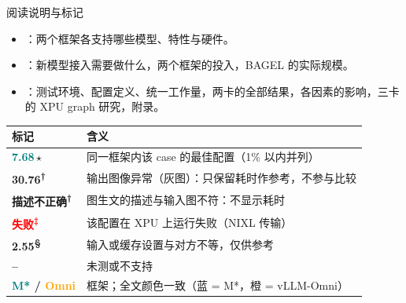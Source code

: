 \begin{frame}[t]{阅读说明与标记}
\small
\begin{itemize}\setlength\itemsep{3pt}
  \item {}：两个框架各支持哪些模型、特性与硬件。
  \item {}：新模型接入需要做什么，两个框架的投入，BAGEL 的实际规模。
  \item {}：测试环境、配置定义、统一工作量，两卡的全部结果，各因素的影响，三卡的 XPU graph 研究，附录。
\end{itemize}
\vspace{2pt}
\scriptsize\renewcommand{\arraystretch}{1.12}
\begin{tabularx}{\textwidth}{>{\bfseries}p{3.0cm} Y}
\toprule
{}
标记 & 含义 \\
\midrule
{}\textbf{\textcolor{Teal}{7.68}}\,$\star$ & 同一框架内该 case 的最佳配置（1\% 以内并列） \\
\textcolor{Muted}{30.76\textsuperscript{†}} & 输出图像异常（灰图）：只保留耗时作参考，不参与比较 \\
\textcolor{Muted}{描述不正确\textsuperscript{†}} & 图生文的描述与输入图不符：不显示耗时 \\
\textcolor{Red}{失败\textsuperscript{‡}} & 该配置在 XPU 上运行失败（NIXL 传输） \\
\textcolor{Muted}{2.55\textsuperscript{§}} & 输入或缓存设置与对方不等，仅供参考 \\
-- & 未测或不支持 \\
\textcolor{Teal}{M*} / \textcolor{Orange}{Omni} & 框架；全文颜色一致（蓝 = M*，橙 = vLLM-Omni） \\
\bottomrule
\end{tabularx}
\end{frame}
